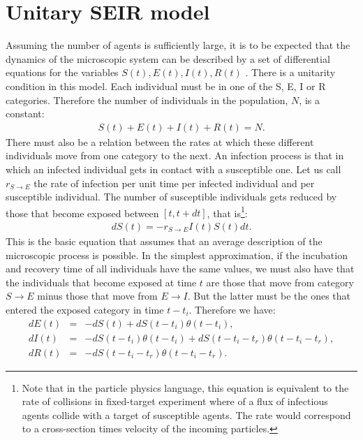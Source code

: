 \documentclass[a4paper,oneside,11pt]{article}
\begin{document}
\section{Unitary SEIR model}
\label{sec:useir}
Assuming the number of agents is sufficiently large, it is to be expected that the dynamics of the microscopic system can be described by a set of differential equations for the variables $S(t), E(t), I(t), R(t)$ \cite{Kermack1927}. There is a unitarity condition in this model. Each individual must be in one of the S, E, I or R categories. Therefore the number of  individuals in the population, $N$, is a constant:
\begin{eqnarray}
S(t)+ E(t)+I(t)+R(t) = N.
\end{eqnarray}
There must also be a relation between the rates at which these different individuals move from one category to the next. An infection process is that in which an infected individual gets in contact with a susceptible one. Let us call $r_{S\rightarrow E}$ the rate of infection per unit time
per infected individual and per susceptible individual. The number of susceptible individuals gets reduced by those that become exposed between $[t, t+dt]$, that is\footnote{Note that in the particle physics language, this equation is equivalent to the rate of collisions in fixed-target experiment where of a flux of infectious agents collide with a target of susceptible agents. The rate would correspond to a cross-section times velocity of the incoming particles.}:
\begin{eqnarray}
d S(t) = - r_{S\rightarrow E} I(t) S(t) dt.
\label{eq:basic}
\end{eqnarray}
This is the basic equation that assumes that an average description of the microscopic process is possible. 
In the simplest approximation, if the incubation and recovery time of all individuals have the same values, we must also have that the individuals that become exposed at time
$t$ are those that move from category $S\rightarrow E$  minus those that move from $E\rightarrow I$. But the latter must be the ones that entered the exposed category in time $t-t_i$. Therefore we have:
\begin{eqnarray}
d E(t) &=& -d S(t) + d S(t-t_i) \theta(t-t_i) ,\nonumber\\
d I(t) &=& -d S(t-t_i) \theta(t-t_i)+ d S(t-t_i-t_r) \theta(t-t_i-t_r),\nonumber\\
d R(t) &=& - d S(t - t_i - t_r) \theta(t-t_i-t_r).\nonumber
\label{eqs:cor}
\end{eqnarray}
\end{document}
